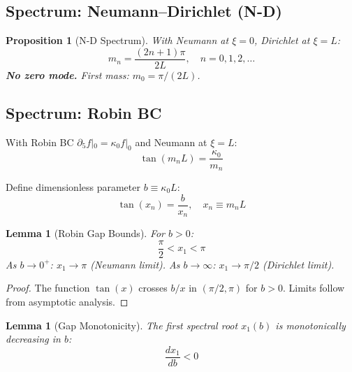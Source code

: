 \documentclass[11pt,a4paper]{article}
\newtheorem{lemma}[theorem]{Lemma}
\newtheorem{proposition}[theorem]{Proposition}
\begin{document}
\subsection{Spectrum: Neumann--Dirichlet (N-D)}

\begin{proposition}[N-D Spectrum]
\label{prop:nd-spectrum}
With Neumann at $\xi=0$, Dirichlet at $\xi=L$:
\begin{equation}
  m_n = \frac{(2n+1)\pi}{2L}, \quad n = 0, 1, 2, \ldots
  \label{eq:nd-masses}
\end{equation}
\textbf{No zero mode.} First mass: $m_0 = \pi/(2L)$.
\end{proposition}

\subsection{Spectrum: Robin BC}

With Robin BC $\partial_5 f|_0 = \kappa_0 f|_0$ and Neumann at $\xi=L$:
\begin{equation}
  \tan(m_n L) = \frac{\kappa_0}{m_n}
  \label{eq:robin-transcendental}
\end{equation}

Define dimensionless parameter $b \equiv \kappa_0 L$:
\begin{equation}
  \boxed{\tan(x_n) = \frac{b}{x_n}, \quad x_n \equiv m_n L}
  \label{eq:robin-dimensionless}
\end{equation}

\begin{lemma}[Robin Gap Bounds]
\label{lem:robin-bounds}
For $b > 0$:
\begin{equation}
  \frac{\pi}{2} < x_1 < \pi
  \label{eq:robin-bounds}
\end{equation}
As $b \to 0^+$: $x_1 \to \pi$ (Neumann limit).
As $b \to \infty$: $x_1 \to \pi/2$ (Dirichlet limit).
\end{lemma}

\begin{proof}
The function $\tan(x)$ crosses $b/x$ in $(\pi/2, \pi)$ for $b > 0$.
Limits follow from asymptotic analysis.
\end{proof}

\begin{lemma}[Gap Monotonicity]
\label{lem:gap-monotonicity}
The first spectral root $x_1(b)$ is monotonically decreasing in $b$:
\begin{equation}
  \frac{dx_1}{db} < 0
  \label{eq:monotonicity}
\end{equation}
\end{lemma}
\end{document}
